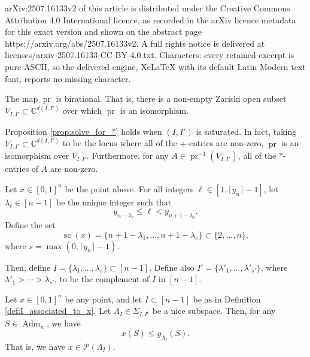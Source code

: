 \documentclass[10pt,a4paper]{amsart}
\DeclareMathOperator{\Adm}{Adm}
\DeclareMathOperator{\SC}{sc}
\DeclareMathOperator{\pr}{pr}
\newcommand{\bC}{\mathbb{C}}
\newcommand{\cP}{\mathcal{P}}
\begin{document}
arXiv:2507.16133v2 of this article is distributed under the Creative Commons Attribution 4.0 International licence, as recorded in the arXiv licence metadata for this exact version and shown on the abstract page https://arxiv.org/abs/2507.16133v2. A full rights notice is delivered at licenses/arxiv-2507.16133-CC-BY-4.0.txt. Characters: every retained excerpt is pure ASCII, so the delivered engine, XeLaTeX with its default Latin Modern text font, reports no missing character.
\begin{proposition}\label{prop:solve_for_*}
The map $\pr$ is birational. That is, there is a non-empty Zariski open subset $V_{I,I'}\subset \bC^{d(I,I')}$ over which $\pr$ is an isomorphism.
\end{proposition}

\begin{proposition}\label{prop:solve_for_*_saturated}
    Proposition \ref{prop:solve_for_*} holds when $(I,I')$ is saturated. In fact, taking $V_{I,I'}\subset\bC^{d(I,I')}$ to be the locus where all of the $+$-entries are non-zero, $\pr$ is an isomorphism over $V_{I,I'}$. Furthermore, for any $A\in\pr^{-1}(V_{I,I'})$, all of the $*$-entries of $A$ are non-zero. 
\end{proposition}

\begin{definition}\label{def:I_associated_to_x}
    Let $x\in[0,1]^n$ be the point above. For all integers $\ell\in[1,\lceil y_n\rceil -1]$, let $\lambda_\ell\in[n-1]$ be the unique integer such that 
    \begin{equation}\label{eq:I'_inequalities}
       y_{n-\lambda_{\ell}}\le\ell< y_{n+1-\lambda_{\ell}}.
    \end{equation}
    Define the set
    \begin{equation*}
        \SC(x)=\{n+1-\lambda_1,\ldots,n+1-\lambda_{s}\}\subset\{2,\ldots,n\},
    \end{equation*}
    where $s=\max(0,\lceil y_n\rceil-1)$.
    
    Then, define $I=\{\lambda_1,\ldots,\lambda_{s}\}\subset[n-1]$. Define also $I'=\{\lambda'_1,\ldots,\lambda'_{s'}\}$, where $\lambda'_1>\cdots>\lambda_{s'}$, to be the complement of $I$ in $[n-1]$.
\end{definition}

\begin{proposition}\label{prop:x_in_P(I)}
    Let $x\in[0,1]^n$ be any point, and let $I\subset [n-1]$ be as in Definition \ref{def:I_associated_to_x}. Let $\Lambda_I\in\Sigma_{I,I^c}$ be a nice subspace. Then, for any $S\in\Adm_n$, we have
    \begin{equation*}
        x(S)\le g_{\Lambda_I}(S).
    \end{equation*}
    That is, we have $x\in\cP(\Lambda_I)$.
\end{proposition}
\end{document}
